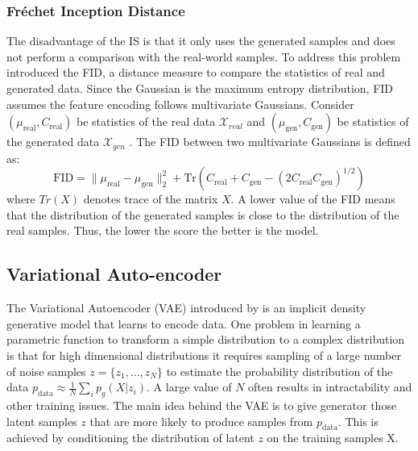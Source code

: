 
\subsubsection{Fr\'{e}chet Inception Distance}
\label{subsec:frechet_dist}
The disadvantage of the IS is that it only uses the generated samples and does not perform a comparison with the real-world samples. To address this problem \citet{heusel2017gans} introduced the FID, a distance measure to compare the statistics of real and generated data. Since the Gaussian is the maximum entropy distribution, FID assumes the feature encoding follows multivariate Gaussians. Consider $(\mu_{\text{real}}, C_{\text{real}})$ be statistics of the real data $\mathcal{X}_{real}$ and $(\mu_{\text{gen}}, C_{\text{gen}})$ be statistics of the generated data $\mathcal{X}_{gen}$ . The FID between two multivariate Gaussians is defined as:
\begin{equation}
    \label{eq:fid_eq}
    \text{FID} = \|\mu_{\text{real}} - \mu_{\text{gen}} \|_2^2 + \text{Tr}(C_{\text{real}}+C_{\text{gen}} - (2C_{\text{real}}C_{\text{gen}})^{1/2})
\end{equation}
where $Tr(X)$ denotes trace of the matrix $X$. A lower value of the FID means that the distribution of the generated samples is close to the distribution of the real samples. Thus, the lower the score the better is the model. 


\subsection{Variational Auto-encoder}
\label{subsec:vae}
The Variational Autoencoder (VAE) introduced by \citet{kingma2013auto} is an implicit density generative model that learns to encode data. One problem in learning a parametric function to transform a simple distribution to a complex distribution is that for high dimensional distributions it requires sampling of a large number of noise samples $z=\{z_1,...,z_N\}$ to estimate the probability distribution of the data $p_\text{data}\approx \frac{1}{N}\sum_i p_g(X|z_i)$. A large value of $N$ often results in intractability and other training issues. The main idea behind the VAE is to give generator those latent samples $z$ that are more likely to produce samples from $p_\text{data}$. This is achieved by conditioning the distribution of latent $z$ on the training samples X. 

